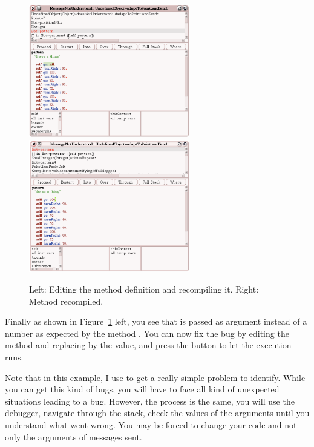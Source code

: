 \begin{figure}[h]
\centerline{\includegraphics[width=7cm]{9DebugAnotherErrorFinding} \includegraphics[width=7cm]{10RecompilingMethod}}
\caption{Left: Editing the method definition and recompiling it. Right: Method  recompiled.\label{fig:9DebuggerPattern}}
\end{figure}


Finally as shown in Figure~\ref{fig:9DebuggerPattern} left, you see that  is passed as argument instead of a number as expected by the method . You can now fix the bug by editing the method  and replacing  by the value, and press the button  to let the execution runs. 

Note that in this example, I use  to get a really simple problem to identify. While you can get this kind of bugs, you will have to face all kind of unexpected situations leading to a bug. However, the process is the same, you will use the debugger, navigate through the stack, check the values of the arguments until you understand what went wrong. You may be forced to change your code and not only the arguments of messages sent. 


\summa

